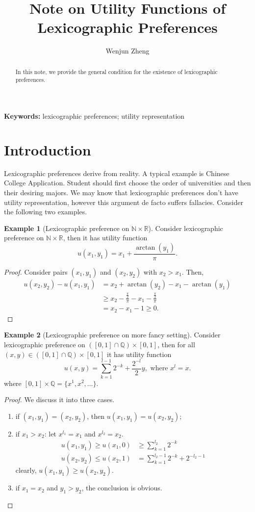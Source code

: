 \documentclass[a4paper, 12pt]{article}
\title{Note on Utility Functions of Lexicographic Preferences}
\date{}
\author{Wenjun Zheng}
\theoremstyle{definition}
\newtheorem{example}{Example}
\newcommand{\summation}[2]{\sum_{#1}^{#2}}
\begin{document}
\maketitle
\begin{abstract}
In this note, we provide the general condition for the existence of lexicographic preferences. 
\end{abstract}

\textbf{Keywords: }lexicographic preferences; utility representation

\section{Introduction}
Lexicographic preferences derive from reality. A typical example is Chinese College Application. Student should first choose the order of universities and then their desiring majors. We may know that lexicographic preferences don't have utility representation, however this argument de facto suffers fallacies. Consider the following two examples.
\begin{example}[Lexicographic preference on $\mathbb{N}\times\mathbb{R}$]
Consider lexicographic preference on $\mathbb{N}\times\mathbb{R}$, then it has utility function
\[
u(x_1,y_1)=x_1+\frac{\arctan(y_1)}{\pi}.
\]
\begin{proof}
Consider pairs $(x_1,y_1)$ and $(x_2,y_2)$ with $x_2>x_1$. Then,
\begin{align*}
u(x_2,y_2)-u(x_1,y_1)&=x_2+\arctan(y_2)-x_1-\arctan(y_1)\\
&\geq x_2-\frac{\frac{\pi}{2}}{\pi}-x_1-\frac{\frac{\pi}{2}}{\pi}\\
&=x_2-x_1-1\geq 0.
\end{align*}
\end{proof}
\end{example}

\begin{example}[Lexicographic preference on more fancy setting]
Consider lexicographic preference on $([0,1]\cap\mathbb{Q})\times [0,1]$, then for all $(x,y)\in([0,1]\cap\mathbb{Q})\times [0,1]$ it has utility function
\[
u(x,y) = \summation{k=1}{l-1}2^{-k}+\frac{2^{-l}}{2}y,\text{ where }x^l=x.
\]
where $[0,1]\times\mathbb{Q}=\{x^1,x^2,\dots\}$.
\begin{proof}
We discuss it into three cases.
\begin{enumerate}[label = (\roman*)]
\item if $(x_1,y_1)=(x_2,y_2)$, then $u(x_1,y_1) = u(x_2,y_2)$;
\item if $x_1>x_2$: let $x^{l_1}=x_1$ and $x^{l_2}=x_2$. 
\begin{align*}
u(x_1,y_1)\geq u(x_1,0)&\geq \summation{k=1}{l_2}2^{-k}\\
u(x_2,y_2)\leq u(x_2,1)&=\summation{k=1}{l_2-1}2^{-k}+2^{-l_2-1}
\end{align*}
clearly, $u(x_1,y_1)\geq u(x_2,y_2)$.
\item if $x_1=x_2$ and $y_1>y_2$, the conclusion is obvious.
\end{enumerate}
\end{proof}
\end{example}
\end{document}
